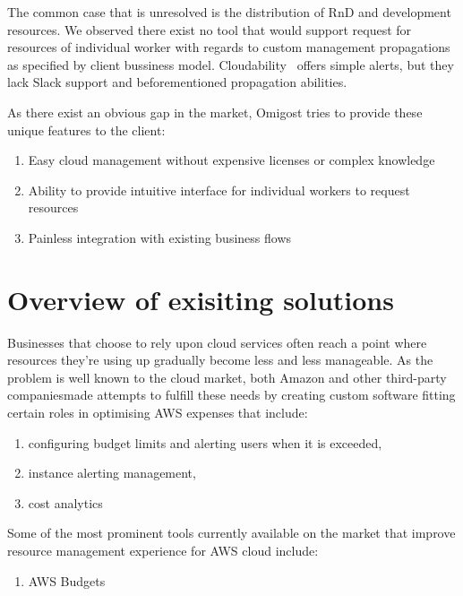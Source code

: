 \documentclass[licencjacka,en]{thesisclass}
\begin{document}
        The common case that is unresolved is the distribution of RnD and development resources.
        We observed there exist no tool that would support request for resources of individual worker with regards to custom management propagations as specified by client bussiness model.
        Cloudability~\cite{CloudabilityAlerts} offers simple alerts, but they lack Slack support and beforementioned propagation abilities.

        As there exist an obvious gap in the market, Omigost tries to provide these unique features to the client:

        \begin{enumerate}
            \item Easy cloud management without expensive licenses or complex knowledge
            \item Ability to provide intuitive interface for individual workers to request resources
            \item Painless integration with existing business flows
        \end{enumerate}

    \section{Overview of exisiting solutions}
    
        Businesses that choose to rely upon cloud services often reach a point where resources
	they’re using up gradually become less and less manageable. As the problem is well known
	to the cloud market, both Amazon and other third-party companiesmade attempts to fulfill
these needs by creating custom software fitting certain roles in optimising AWS expenses that include:        

        \begin{enumerate}
		\item configuring budget limits and alerting users when it is exceeded,
		\item instance alerting management,
		\item cost analytics
        \end{enumerate}

        Some of the most prominent tools currently available on the market that improve resource management experience for AWS cloud include:
        
        \begin{enumerate}
            \item AWS Budgets
        \end{enumerate}
        
\end{document}
